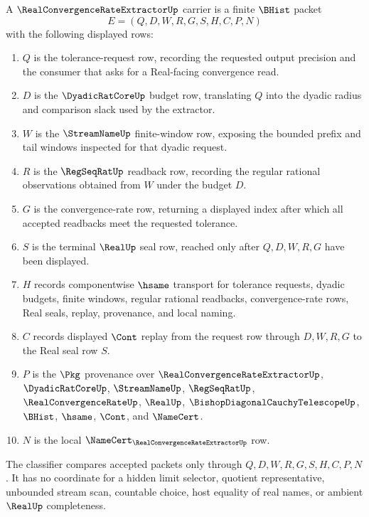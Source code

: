 \begin{definition}
\label{def:real-convergence-rate-extractor-carrier}
A $\RealConvergenceRateExtractorUp$ carrier is a finite $\BHist$ packet
$$
E=(Q,D,W,R,G,S,H,C,P,N)
$$
with the following displayed rows:
\begin{enumerate}
\item $Q$ is the tolerance-request row, recording the requested output precision and the consumer that asks for a Real-facing convergence read.
\item $D$ is the $\DyadicRatCoreUp$ budget row, translating $Q$ into the dyadic radius and comparison slack used by the extractor.
\item $W$ is the $\StreamNameUp$ finite-window row, exposing the bounded prefix and tail windows inspected for that dyadic request.
\item $R$ is the $\RegSeqRatUp$ readback row, recording the regular rational observations obtained from $W$ under the budget $D$.
\item $G$ is the convergence-rate row, returning a displayed index after which all accepted readbacks meet the requested tolerance.
\item $S$ is the terminal $\RealUp$ seal row, reached only after $Q,D,W,R,G$ have been displayed.
\item $H$ records componentwise $\hsame$ transport for tolerance requests, dyadic budgets, finite windows, regular rational readbacks, convergence-rate rows, Real seals, replay, provenance, and local naming.
\item $C$ records displayed $\Cont$ replay from the request row through $D,W,R,G$ to the Real seal row $S$.
\item $P$ is the $\Pkg$ provenance over $\RealConvergenceRateExtractorUp$, $\DyadicRatCoreUp$, $\StreamNameUp$, $\RegSeqRatUp$, $\RealConvergenceRateUp$, $\RealUp$, $\BishopDiagonalCauchyTelescopeUp$, $\BHist$, $\hsame$, $\Cont$, and $\NameCert$.
\item $N$ is the local $\NameCert_{\RealConvergenceRateExtractorUp}$ row.
\end{enumerate}
The classifier compares accepted packets only through $Q,D,W,R,G,S,H,C,P,N$. It has no coordinate for a hidden limit selector, quotient representative, unbounded stream scan, countable choice, host equality of real names, or ambient $\RealUp$ completeness.
\end{definition}

